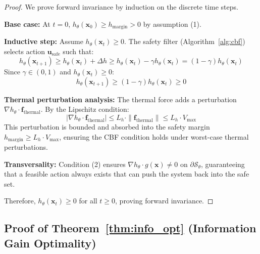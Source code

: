 \documentclass[12pt,a4paper]{article}
\DeclareRobustCommand{\cS}{\mathcal{S}}
\DeclareRobustCommand{\vect}[1]{\bm{#1}}
\begin{document}
\begin{proof}
We prove forward invariance by induction on the discrete time steps.

\textbf{Base case:} At $t=0$, $h_\theta(\vect{x}_0) \geq h_{\text{margin}} > 0$ by assumption (1).

\textbf{Inductive step:} Assume $h_\theta(\vect{x}_t) \geq 0$. The safety filter (Algorithm~\ref{alg:cbf}) selects action $\vect{u}_{\text{safe}}$ such that:
\begin{equation}
    h_\theta(\vect{x}_{t+1}) \geq h_\theta(\vect{x}_t) + \Delta h \geq h_\theta(\vect{x}_t) - \gamma h_\theta(\vect{x}_t) = (1-\gamma) h_\theta(\vect{x}_t)
\end{equation}
Since $\gamma \in (0, 1)$ and $h_\theta(\vect{x}_t) \geq 0$:
\begin{equation}
    h_\theta(\vect{x}_{t+1}) \geq (1-\gamma) h_\theta(\vect{x}_t) \geq 0
\end{equation}

\textbf{Thermal perturbation analysis:} The thermal force adds a perturbation $\nabla h_\theta \cdot \vect{f}_{\text{thermal}}$. By the Lipschitz condition:
\begin{equation}
    |\nabla h_\theta \cdot \vect{f}_{\text{thermal}}| \leq L_h \cdot \|\vect{f}_{\text{thermal}}\| \leq L_h \cdot V_{\max}
\end{equation}
This perturbation is bounded and absorbed into the safety margin $h_{\text{margin}} \geq L_h \cdot V_{\max}$, ensuring the CBF condition holds under worst-case thermal perturbations.

\textbf{Transversality:} Condition (2) ensures $\nabla h_\theta \cdot g(\vect{x}) \neq 0$ on $\partial\cS_\theta$, guaranteeing that a feasible action always exists that can push the system back into the safe set.

Therefore, $h_\theta(\vect{x}_t) \geq 0$ for all $t \geq 0$, proving forward invariance.
\end{proof}

\subsection{Proof of Theorem~\ref{thm:info_opt} (Information Gain Optimality)}
\end{document}
